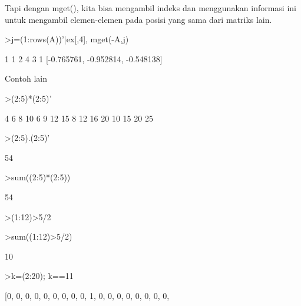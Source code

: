\documentclass[a4paper,10pt]{article}
\begin{document}
\begin{eulernotebook}
\begin{eulercomment}
\begin{eulercomment}
\begin{eulercomment}
Tapi dengan mget(), kita bisa mengambil indeks dan menggunakan
informasi ini untuk mengambil elemen-elemen pada posisi yang sama dari
matriks lain.
\end{eulercomment}
\begin{eulerprompt}
>j=(1:rows(A))'|ex[,4], mget(-A,j)
\end{eulerprompt}
\begin{euleroutput}
              1             1 
              2             4 
              3             1 
  [-0.765761,  -0.952814,  -0.548138]
\end{euleroutput}
\begin{eulercomment}
Contoh lain
\end{eulercomment}
\begin{eulerprompt}
>(2:5)*(2:5)'
\end{eulerprompt}
\begin{euleroutput}
              4             6             8            10 
              6             9            12            15 
              8            12            16            20 
             10            15            20            25 
\end{euleroutput}
\begin{eulerprompt}
>(2:5).(2:5)'
\end{eulerprompt}
\begin{euleroutput}
  54
\end{euleroutput}
\begin{eulerprompt}
>sum((2:5)*(2:5))
\end{eulerprompt}
\begin{euleroutput}
  54
\end{euleroutput}
\begin{eulerprompt}
>(1:12)>5/2
\end{eulerprompt}
\begin{euleroutput}
  [0,  0,  1,  1,  1,  1,  1,  1,  1,  1,  1,  1]
\end{euleroutput}
\begin{eulerprompt}
>sum((1:12)>5/2)
\end{eulerprompt}
\begin{euleroutput}
  10
\end{euleroutput}
\begin{eulerprompt}
>k=(2:20); k==11
\end{eulerprompt}
\begin{euleroutput}
  [0,  0,  0,  0,  0,  0,  0,  0,  0,  1,  0,  0,  0,  0,  0,  0,  0,  0,

\end{euleroutput}
\end{eulercomment}
\end{eulercomment}
\end{eulernotebook}
\end{document}
